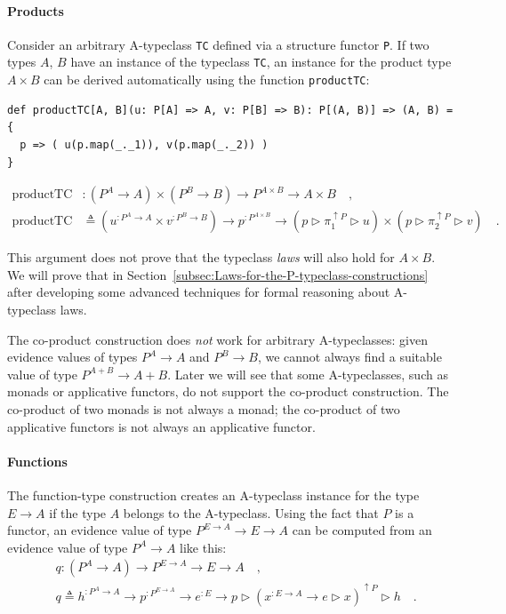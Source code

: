 \paragraph{Products}

Consider an arbitrary A-typeclass \lstinline!TC! defined via a structure
functor \lstinline!P!. If two types $A$, $B$ have an instance of
the typeclass \lstinline!TC!, an instance for the product type $A\times B$
can be derived automatically using the function \lstinline!productTC!:
\begin{lstlisting}
def productTC[A, B](u: P[A] => A, v: P[B] => B): P[(A, B)] => (A, B) = {
  p => ( u(p.map(_._1)), v(p.map(_._2)) )
}
\end{lstlisting}
\begin{align*}
\text{productTC} & :(P^{A}\rightarrow A)\times(P^{B}\rightarrow B)\rightarrow P^{A\times B}\rightarrow A\times B\quad,\\
\text{productTC} & \triangleq(u^{:P^{A}\rightarrow A}\times v^{:P^{B}\rightarrow B})\rightarrow p^{:P^{A\times B}}\rightarrow(p\triangleright\pi_{1}^{\uparrow P}\triangleright u)\times(p\triangleright\pi_{2}^{\uparrow P}\triangleright v)\quad.
\end{align*}

This argument does not prove that the typeclass \emph{laws} will also
hold for $A\times B$. We will prove that in Section~\ref{subsec:Laws-for-the-P-typeclass-constructions}
after developing some advanced techniques for formal reasoning about
A-typeclass laws.

The co-product construction does \emph{not} work for arbitrary A-typeclasses:
given evidence values of types $P^{A}\rightarrow A$ and $P^{B}\rightarrow B$,
we cannot always find a suitable value of type $P^{A+B}\rightarrow A+B$.
Later we will see that some A-typeclasses, such as monads or applicative
functors, do not support the co-product construction. The co-product
of two monads is not always a monad; the co-product of two applicative
functors is not always an applicative functor.

\paragraph{Functions}

The function-type construction creates an A-typeclass instance for
the type $E\rightarrow A$ if the type $A$ belongs to the A-typeclass.
Using the fact that $P$ is a functor, an evidence value of type $P^{E\rightarrow A}\rightarrow E\rightarrow A$
can be computed from an evidence value of type $P^{A}\rightarrow A$
like this:
\begin{align*}
 & q:(P^{A}\rightarrow A)\rightarrow P^{E\rightarrow A}\rightarrow E\rightarrow A\quad,\\
 & q\triangleq h^{:P^{A}\rightarrow A}\rightarrow p^{:P^{E\rightarrow A}}\rightarrow e^{:E}\rightarrow p\triangleright(x^{:E\rightarrow A}\rightarrow e\triangleright x)^{\uparrow P}\triangleright h\quad.
\end{align*}

